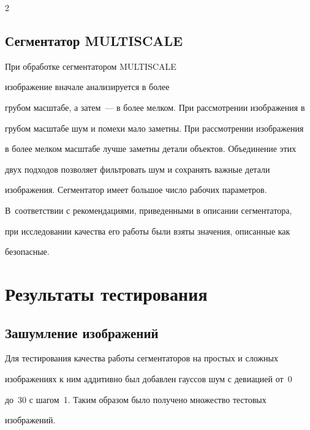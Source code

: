 \begin{multicols}{2}
  


  \subsection{Сегментатор MULTISCALE} %


  


  При обработке сегментатором MULTISCALE~\cite{12-kol}


  изображение вначале анализируется в более 


грубом масштабе, а затем~--- в более мелком. При рассмотрении изоб\-ра\-же\-ния в 


грубом масштабе шум и помехи мало заметны. При рассмотрении изображения 


в более мелком масштабе лучше заметны детали объектов. Объединение этих 


двух подходов позволяет фильт\-ро\-вать шум и сохранять важные детали 


изображения. Сегментатор имеет большое число рабочих параметров. 


В~соответствии с рекомендациями, приведенными в описании сегментатора, 


при исследовании качества его работы были взяты значения, описанные как 


безопасные.


  


  \section{Результаты тестирования}


  


  \subsection{Зашумление изображений} %


  


  Для тестирования качества работы сегментаторов на простых и сложных 


изображениях к ним аддитивно был добавлен гауссов шум с девиацией от~0 


до~30 с шагом~1. Таким образом было получено множество тестовых 


изображений.


  



\end{multicols}
